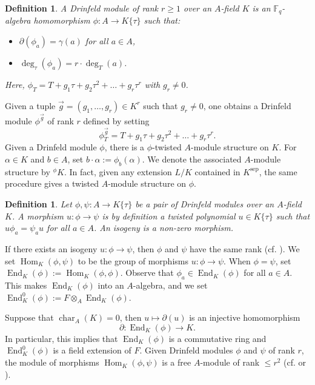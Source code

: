 \documentclass[11pt]{amsart}
\newtheorem{definition}[theorem]{Definition}
\newcommand{\op}[1]{\operatorname{#1}}
\numberwithin{equation}{section}
\begin{document}
\begin{definition}
    A Drinfeld module of rank $ r \geq 1 $ over an $ A $-field $ K $ is an $\mathbb{F}_q$-algebra homomorphism $\phi: A \rightarrow K\{\tau\}$ such that:
    \begin{itemize}
        \item $\partial(\phi_a) = \gamma(a)$ for all $a \in A$,
        \item $\op{deg}_\tau(\phi_a) = r \cdot \op{deg}_T(a)$.
    \end{itemize}
Here, $\phi_T = T + g_1 \tau + g_2 \tau^2 + \dots + g_r \tau^r$ with $ g_r \neq 0 $.
\end{definition}
Given a tuple $\vec{g}=(g_1, \dots, g_r)\in K^r$ such that $g_r\neq 0$, one obtains a Drinfeld module $\phi^{\vec{g}}$ of rank $r$ defined by setting
\[\phi_T^{\vec{g}}=T + g_1 \tau + g_2 \tau^2 + \dots + g_r \tau^r.\]
Given a Drinfeld module $\phi$, there is a $\phi$-twisted $A$-module structure on $K$. For $\alpha\in K$ and $b\in A$, set $b\cdot \alpha:=\phi_b(\alpha)$. We denote the associated $A$-module structure by $^\phi K$. In fact, given any extension $L/K$ contained in $K^{\op{sep}}$, the same procedure gives a twisted $A$-module structure on $\phi$. 
\begin{definition}
    Let $\phi, \psi: A\rightarrow K\{\tau\}$ be a pair of Drinfeld modules over an $A$-field $K$. A morphism $u: \phi\rightarrow \psi$ is by definition a twisted polynomial $u\in K\{\tau\}$ such that $u \phi_a=\psi_a u$ for all $a\in A$. An isogeny is a non-zero morphism. 
\end{definition}
If there exists an isogeny $u: \phi\rightarrow \psi$, then $\phi$ and $\psi$ have the same rank (cf. \cite[Proposition 3.3.4]{papibook}). We set $\op{Hom}_K(\phi, \psi)$ to be the group of morphisms $u: \phi\rightarrow \psi$. When $\phi=\psi$, set $\op{End}_K(\phi):=\op{Hom}_K(\phi, \phi)$. Observe that $\phi_a\in \op{End}_K(\phi)$ for all $a\in A$. This makes $\op{End}_K(\phi)$ into an $A$-algebra, and we set $\op{End}_K^0(\phi):=F\otimes_A \op{End}_K(\phi)$. 
\par Suppose that $\op{char}_A(K)=0$, then $u\mapsto \partial(u)$ is an injective homomorphism 
\[\partial: \op{End}_K(\phi)\rightarrow K.\] In particular, this implies that $\op{End}_K(\phi)$ is a commutative ring and $\op{End}_K^0(\phi)$ is a field extension of $F$. Given Drinfeld modules $\phi$ and $\psi$ of rank $r$, the module of morphisms $\op{Hom}_K(\phi, \psi)$ is a free $A$-module of rank $\leq r^2$ (cf. \cite{Drinfeldoriginal} or \cite[Theorem 3.4.1]{papibook}).
\end{document}
